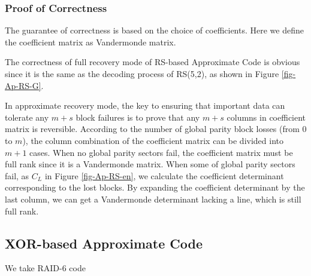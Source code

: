 \documentclass[sigconf]{acmart}
\begin{document}
\subsubsection{Proof of Correctness}
The guarantee of correctness is based on the choice of coefficients. Here we define the coefficient matrix as Vandermonde matrix.

The correctness of full recovery mode of RS-based Approximate Code is obvious since it is the same as the decoding process of RS(5,2), as shown in Figure \ref{fig-Ap-RS-G}.

In approximate recovery mode, the key to ensuring that important data can tolerate any $m+s$ block failures is to prove that any $m+s$ columns in coefficient matrix is reversible. According to the number of global parity block losses (from 0 to $m$), the column combination of the coefficient matrix can be divided into $m+1$ cases. When no global parity sectors fail, the coefficient matrix must be full rank since it is a Vandermonde matrix. When some of global parity sectors fail, as $C_L$ in Figure \ref{fig-Ap-RS-en}, we calculate the coefficient determinant corresponding to the lost blocks. By expanding the coefficient determinant by the last column, we can get a Vandermonde determinant lacking a line, which is still full rank.


\subsection{ XOR-based Approximate Code}
We take RAID-6 code
\end{document}
